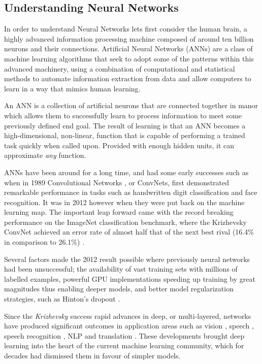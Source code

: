\documentclass[a4paper,11pt,titlepage]{article}
\begin{document}
	\subsection{Understanding Neural Networks}
		\par
			In order to understand Neural Networks lets first consider the human brain, a highly advanced information processing machine composed of around ten billion neurons and their connections. Artificial Neural Networks (ANNs) are a class of machine learning algorithms that seek to adopt some of the patterns within this advanced machinery, using a combination of computational and statistical methods to automate information extraction from data and allow computers to learn in a way that mimics human learning.
			\par 
			An ANN is a collection of artificial neurons that are connected together in manor which allows them to successfully learn to process information to meet some previously defined end goal. The result of learning is that an ANN becomes a high-dimensional, non-linear, function that is capable of performing a trained task quickly when called upon. Provided with enough hidden units, it can approximate \textit{any} function. 
			\par
			ANNs have been around for a long time, and had some early successes such as when in 1989 Convolutional Networks \cite{LeCun1989}, or ConvNets, first demonstrated remarkable performance in tasks such as handwritten digit classification and face recognition. It was in 2012 however when they were put back on the machine learning map. The important leap forward came with the record breaking performance on the ImageNet classification benchmark, where the Krizhevsky ConvNet achieved an error rate of almost half that of the next best rival (16.4\% in comparison to 26.1\%) \cite{Krizhevsky2012}.
			\par
			Several factors made the 2012 result possible where previously neural networks had been unsuccessful; the availability of vast training sets with millions of labelled examples, powerful GPU implementations speeding up training by great magnitudes thus enabling deeper models, and better model regularization strategies, such as Hinton's dropout \cite{Hinton2012}.
			\par 
			Since the \textit{Krizhevsky} success rapid advances in deep, or multi-layered, networks have produced significant outcomes in application areas such as vision \cite{Russakovsky2015}, speech \cite{Sutskever2014}, speech recognition \cite{Sainath2015}, NLP \cite{Norouzi2014} and  translation \cite{Graves2014}. These developments brought deep learning into the heart of the current machine learning community, which for decades had dismissed them in favour of simpler models.
\\\
\\\	
\end{document}
